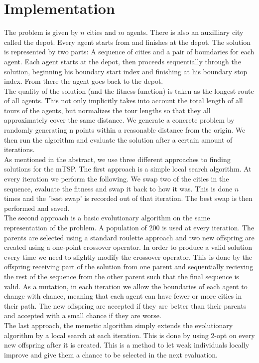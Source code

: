 \documentclass[journal]{IEEEtrancz}
\begin{document}
\section{Implementation}
The problem is given by $n$ cities and $m$ agents. There is also an auxilliary city called the depot. Every agent
starts from and finishes at the depot. The solution is represented by two parts: A sequence of cities and a pair of boundaries for each agent. Each agent starts at the depot, then proceeds sequentially through the solution, beginning his boundary start index and finishing at his boundary stop index. From there the agent goes back to the depot. \\
The quality of the solution (and the fitness function) is taken as the longest route of all agents. This not only implicitly takes into account the total length of all tours of the agents, but normalizes the tour lengths so that they all approximately cover the same distance. We generate a concrete problem by randomly generating n points within a reasonable distance from the origin. We then run the algorithm and evaluate the solution after a certain amount of iterations. \\
As mentioned in the abstract, we use three different approaches to finding solutions for the mTSP.
The first approach is a simple local search algorithm. At every iteration we perform the following. We swap two of the cities in the sequence, evaluate the fitness and swap it back to how it was. This is done $n$ times
and the 'best swap' is recorded out of that iteration. The best swap is then performed and saved. \\
The second approach is a basic evolutionary algorithm on the same representation of the problem. 
A population of 200 is used at every iteration. The parents are selected using a standard roulette approach
and two new offspring are created using a one-point crossover operator. In order to produce a valid solution
every time we need to slightly modify the crossover operator. This is done by the offspring receiving part of the solution from one parent and sequentially recieving the rest of the sequence from the other parent such that the final sequence is valid. As a mutation, in each iteration we allow the boundaries of each agent to change with chance, meaning that each agent can have fewer or more cities in their path. The new offspring are accepted if they are better than their parents and accepted with a small chance if they are worse. \\
The last approach, the memetic algorithm simply extends the evolutionary algorithm by a local search at each iteration. This is done by using 2-opt on every new offspring after it is created. This is a method to let weak individuals locally improve and give them a chance to be selected in the next evaluation.
\end{document}
